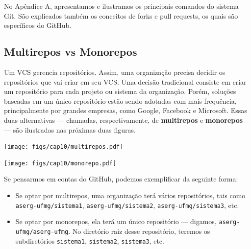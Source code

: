 \documentclass[
  11pt,
  twoside]{book}
\newcommand{\passthrough}[1]{#1}
\let\origfigure\figure
\let\endorigfigure\endfigure
\renewenvironment{figure}[1][2] {
    \expandafter\origfigure\expandafter[!h]
} {
    \endorigfigure
}
\begin{document}
No Apêndice A, apresentamos e ilustramos os principais comandos do
sistema Git. São explicados também os conceitos de forks e pull
requests, os quais são específicos do GitHub.

\hypertarget{multirepos-vs-monorepos}{%
\subsection{Multirepos vs Monorepos}\label{multirepos-vs-monorepos}}


Um VCS gerencia repositórios. Assim, uma organização precisa decidir os
repositórios que vai criar em seu VCS. Uma decisão tradicional consiste
em criar um repositório para cada projeto ou sistema da organização.
Porém, soluções baseadas em um único repositório estão sendo adotadas
com mais frequência, principalmente por grandes empresas, como Google,
Facebook e Microsoft. Essas duas alternativas --- chamadas,
respectivamente, de \textbf{multirepos} e \textbf{monorepos} --- são
ilustradas nas próximas duas figuras.

\begin{figure}
\centering
\texttt{[image: figs/cap10/multirepos.pdf]}
\caption{Multirepos: um VCS gerencia vários repositórios. Normalmente,
um repositório por projeto ou sistema.}
\end{figure}

\begin{figure}
\centering
\texttt{[image: figs/cap10/monorepo.pdf]}
\caption{Monorepos: VCS gerencia um único repositório. Projetos são
diretórios desse repositório.}
\end{figure}

Se pensarmos em contas do GitHub, podemos exemplificar da seguinte
forma:

\begin{itemize}
\item
  Se optar por multirepos, uma organização terá vários repositórios,
  tais como \passthrough{\lstinline!aserg-ufmg/sistema1!},
  \passthrough{\lstinline!aserg-ufmg/sistema2!},
  \passthrough{\lstinline!aserg-ufmg/sistema3!}, etc.
\item
  Se optar por monorepos, ela terá um único repositório --- digamos,
  \passthrough{\lstinline!aserg-ufmg/aserg-ufmg!}. No diretório raiz
  desse repositório, teremos os subdiretórios
  \passthrough{\lstinline!sistema1!},
  \passthrough{\lstinline!sistema2!},
  \passthrough{\lstinline!sistema3!}, etc.
\end{itemize}
\end{document}
